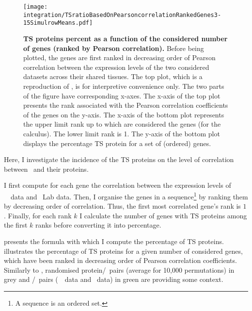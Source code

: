 \begin{figure}[!ht]
    \texttt{[image: integration/TSratioBasedOnPearsoncorrelationRankedGenes3-15SimulrowMeans.pdf]}\centering
    \vspace{-3mm}
    \caption[TS proteins percentage as a function of
    the considered number of genes (ranked by Pearson correlation)]{\label{fig:Spe_Cor}%
    \textbf{TS proteins percent as a function of the considered
    number of genes (ranked by Pearson correlation).}
    Before being plotted,
    the genes are first ranked in decreasing order of Pearson correlation
    between the expression levels of the two considered datasets
    across their shared tissues.
    The top plot, which is a reproduction of ,
    is for interpretive convenience only.
    The two parts of the figure have corresponding x-axes.
    The x-axis of the top plot presents the rank associated with
    the Pearson correlation coefficients of the genes on the y-axis.
    The x-axis of the bottom plot represents
    the upper limit rank up to which are considered
    the genes (for the calculus).
    The lower limit rank is 1.
    The y-axis of the bottom plot displays the percentage \gls{TS} protein
    for a set of (ordered) genes.
    }
\end{figure}

Here,
I investigate the incidence of the \gls{TS} proteins
on the level of correlation between \mRNAs\ and their proteins.

I first compute for each gene the correlation between the expression levels
of \uhlen\ \etal\ data and \pandey\ Lab data.
Then, I organise the genes in a sequence\footnote{A sequence is an ordered set.}
by ranking them by decreasing order of correlation.
Thus, the first most correlated gene's rank is $1$.
Finally, for each rank $k$ I calculate the number of genes with \gls{TS} proteins
among the first $k$ ranks before converting it into percentage.\mybr\

 presents the formula with which I compute
the percentage of \gls{TS} proteins.
 illustrates the percentage of \gls{TS} proteins
for a given number of considered genes,
which have been ranked in decreasing order of Pearson correlation coefficients.
Similarly to ,
randomised protein/\mRNA\ pairs (average for 10,000 permutations) in grey
and \mRNA/\mRNA\ pairs (\uhlen\ \etal\ data and \gtex\ data) in green
are providing some context.\mybr\


